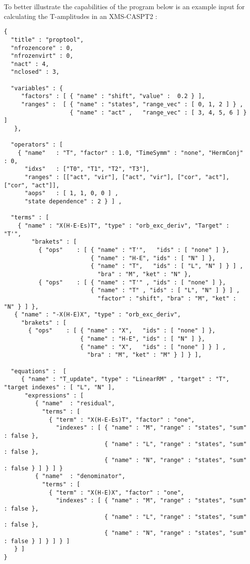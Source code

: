 To better illustrate the capabilities of the program below is an example input
for calculating the T-amplitudes in an XMS-CASPT2 :
\begin{lstlisting}[label={lst:input}]
{
  "title" : "proptool",
  "nfrozencore" : 0,
  "nfrozenvirt" : 0,
  "nact" : 4,
  "nclosed" : 3,

  "variables" : {
     "factors" : [ { "name" : "shift", "value" :  0.2 } ],
     "ranges" :  [ { "name" : "states", "range_vec" : [ 0, 1, 2 ] } ,
                   { "name" : "act" ,   "range_vec" : [ 3, 4, 5, 6 ] } ]
   },

  "operators" : [
    { "name"   : "T", "factor" : 1.0, "TimeSymm" : "none", "HermConj" : 0,
      "idxs"   : ["T0", "T1", "T2", "T3"],
      "ranges" : [["act", "vir"], ["act", "vir"], ["cor", "act"], ["cor", "act"]],
      "aops"   : [ 1, 1, 0, 0 ] ,
      "state dependence" : 2 } ] ,

  "terms" : [
    { "name" : "X(H-E-Es)T", "type" : "orb_exc_deriv", "Target" : "T'",
        "brakets" : [
          { "ops"    : [ { "name" : "T'",   "ids" : [ "none" ] },
                         { "name" : "H-E", "ids" : [ "N" ] },
                         { "name" : "T",   "ids" : [ "L", "N" ] } ] ,
                           "bra" : "M", "ket" : "N" }, 
          { "ops"    : [ { "name" : "T'" , "ids" : [ "none" ] },
                         { "name" : "T" , "ids" : [ "L", "N" ] } ] ,
                           "factor" : "shift", "bra" : "M", "ket" : "N" } ] },
   { "name" : "-X(H-E)X", "type" : "orb_exc_deriv",
     "brakets" : [
       { "ops"    : [ { "name" : "X",   "ids" : [ "none" ] },
                      { "name" : "H-E", "ids" : [ "N" ] },
                      { "name" : "X",   "ids" : [ "none" ] } ] ,
                        "bra" : "M", "ket" : "M" } ] } ],

  "equations" :  [
     { "name" : "T_update", "type" : "LinearRM" , "target" : "T", "target indexes" : [ "L", "N" ],
      "expressions" : [
         { "name"  : "residual",
           "terms" : [
             { "term" : "X(H-E-Es)T", "factor" : "one",
               "indexes" : [ { "name" : "M", "range" : "states", "sum" : false },
                             { "name" : "L", "range" : "states", "sum" : false },
                             { "name" : "N", "range" : "states", "sum" : false } ] } ] }
         { "name"  : "denominator",
           "terms" : [
             { "term" : "X(H-E)X", "factor" : "one",                                                 
               "indexes" : [ { "name" : "M", "range" : "states", "sum" : false },
                             { "name" : "L", "range" : "states", "sum" : false },
                             { "name" : "N", "range" : "states", "sum" : false } ] } ] } ]
   } ]
}                                                 
\end{lstlisting}         

